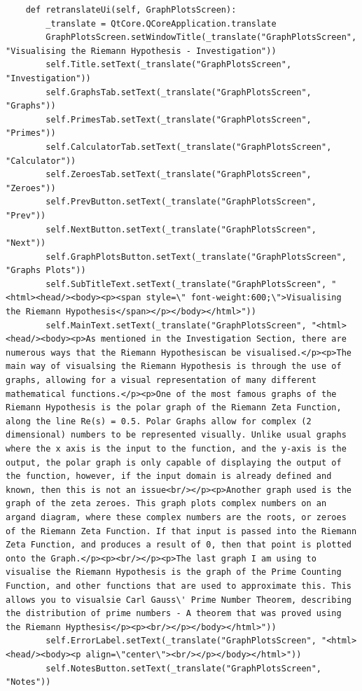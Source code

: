 \documentclass{article}
\begin{document}
\begin{lstlisting}
    def retranslateUi(self, GraphPlotsScreen):
        _translate = QtCore.QCoreApplication.translate
        GraphPlotsScreen.setWindowTitle(_translate("GraphPlotsScreen", "Visualising the Riemann Hypothesis - Investigation"))
        self.Title.setText(_translate("GraphPlotsScreen", "Investigation"))
        self.GraphsTab.setText(_translate("GraphPlotsScreen", "Graphs"))
        self.PrimesTab.setText(_translate("GraphPlotsScreen", "Primes"))
        self.CalculatorTab.setText(_translate("GraphPlotsScreen", "Calculator"))
        self.ZeroesTab.setText(_translate("GraphPlotsScreen", "Zeroes"))
        self.PrevButton.setText(_translate("GraphPlotsScreen", "Prev"))
        self.NextButton.setText(_translate("GraphPlotsScreen", "Next"))
        self.GraphPlotsButton.setText(_translate("GraphPlotsScreen", "Graphs Plots"))
        self.SubTitleText.setText(_translate("GraphPlotsScreen", "<html><head/><body><p><span style=\" font-weight:600;\">Visualising the Riemann Hypothesis</span></p></body></html>"))
        self.MainText.setText(_translate("GraphPlotsScreen", "<html><head/><body><p>As mentioned in the Investigation Section, there are numerous ways that the Riemann Hypothesiscan be visualised.</p><p>The main way of visualsing the Riemann Hypothesis is through the use of graphs, allowing for a visual representation of many different mathematical functions.</p><p>One of the most famous graphs of the Riemann Hypothesis is the polar graph of the Riemann Zeta Function, along the line Re(s) = 0.5. Polar Graphs allow for complex (2 dimensional) numbers to be represented visually. Unlike usual graphs where the x axis is the input to the function, and the y-axis is the output, the polar graph is only capable of displaying the output of the function, however, if the input domain is already defined and known, then this is not an issue<br/></p><p>Another graph used is the graph of the zeta zeroes. This graph plots complex numbers on an argand diagram, where these complex numbers are the roots, or zeroes of the Riemann Zeta Function. If that input is passed into the Riemann Zeta Function, and produces a result of 0, then that point is plotted onto the Graph.</p><p><br/></p><p>The last graph I am using to visualise the Riemann Hypothesis is the graph of the Prime Counting Function, and other functions that are used to approximate this. This allows you to visualsie Carl Gauss\' Prime Number Theorem, describing the distribution of prime numbers - A theorem that was proved using the Riemann Hypthesis</p><p><br/></p></body></html>"))
        self.ErrorLabel.setText(_translate("GraphPlotsScreen", "<html><head/><body><p align=\"center\"><br/></p></body></html>"))
        self.NotesButton.setText(_translate("GraphPlotsScreen", "Notes"))
\end{lstlisting}
\end{document}
